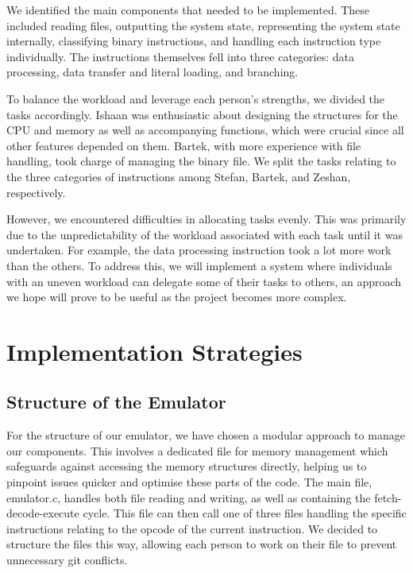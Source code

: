 \documentclass[11pt]{article}
\begin{document}
We identified the main components that needed to be implemented. These included reading files, outputting the system state, representing the system state internally, classifying binary instructions, and handling each instruction type individually. The instructions themselves fell into three categories: data processing, data transfer and literal loading, and branching.

To balance the workload and leverage each person's strengths, we divided the tasks accordingly. Ishaan was enthusiastic about designing the structures for the CPU and memory as well as accompanying functions, which were crucial since all other features depended on them. Bartek, with more experience with file handling, took charge of managing the binary file. We split the tasks relating to the three categories of instructions among Stefan, Bartek, and Zeshan, respectively.

However, we encountered difficulties in allocating tasks evenly. This was primarily due to the unpredictability of the workload associated with each task until it was undertaken. For example, the data processing instruction took a lot more work than the others. To address this, we will implement a system where individuals with an uneven workload can delegate some of their tasks to others, an approach we hope will prove to be useful as the project becomes more complex.


\section{Implementation Strategies}


\subsection{Structure of the Emulator}


For the structure of our emulator, we have chosen a modular approach to manage our components. This involves a dedicated file for memory management which safeguards against accessing the memory structures directly, helping us to pinpoint issues quicker and optimise these parts of the code. The main file, emulator.c, handles both file reading and writing, as well as containing the fetch-decode-execute cycle. This file can then call one of three files handling the specific instructions relating to the opcode of the current instruction. We decided to structure the files this way, allowing each person to work on their file to prevent unnecessary git conflicts.
\end{document}
